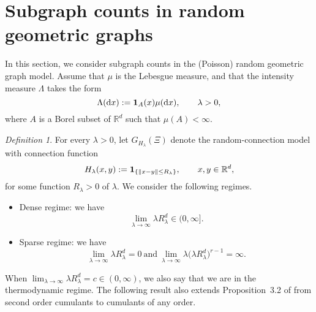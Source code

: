 \documentclass[bj,authoryear,noshowframe]{imsart}
\theoremstyle{plain}
\theoremstyle{remark}
\newtheorem{definition}[theorem]{Definition}
\newcommand{\R}{\mathbb{R}}
\newcommand{\bone}{{\bf 1}}
\def\real{{\mathord{\mathbb R}}}
\begin{document}
\section{Subgraph counts in random geometric graphs}
\label{rgg}
\noindent
In this section, we consider subgraph counts in
the (Poisson) random geometric graph model.
Assume that $\mu$ is the Lebesgue measure,
and that the intensity measure $\Lambda$ takes the form 
$$\Lambda (\mathrm{d}x) := {\bf 1}_A (x) \mu(\mathrm{d}x),\qquad\lambda>0,$$
  where $A$ is a Borel subset of $\real^d$
  such that $\mu (A)<\infty$. 
\begin{definition}
  For every $\lambda >0$,
  let $G_{H_\lambda} (\Xi)$
  denote the random-connection model
  with connection function 
  $$
  H_\lambda (x,y):=\bone_{\{\|x-y\|\leq R_\lambda\}},
  \qquad x,y\in\R^d,
  $$
  for some function $R_\lambda>0$ of $\lambda$.
 We consider the following regimes. 
\begin{itemize}
\item Dense regime: we have 
$$ 
    \lim_{\lambda\to \infty} \lambda R_\lambda^d \in (0,\infty]. 
$$
\item Sparse regime: we have 
$$ 
 \lim_{\lambda\to \infty} \lambda R_\lambda^d = 0
\ \mathrm{and} \
\lim_{\lambda\to \infty}
\lambda \big( \lambda R_\lambda^d \big)^{r-1} = \infty.
$$
\end{itemize} 
\end{definition}
When $\lim_{\lambda\to \infty} \lambda R_\lambda^d = c \in (0,\infty )$, 
we also say that we are in the thermodynamic regime.
The following result also extends Proposition~3.2 of \cite{lachiezerey2}
from second order cumulants to cumulants of any order. 
\end{document}
